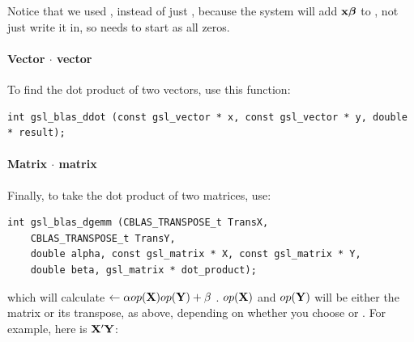 Notice that we used , instead of just , because
the system will add ${\bf x}{\mbox{\boldmath$\beta$}}$ to , not just write it in,
so  needs to start as all zeros.

\paragraph{Vector $\cdot$ vector}
To find the dot product of two vectors, use this function:
\begin{lstlisting}
int gsl_blas_ddot (const gsl_vector * x, const gsl_vector * y, double * result);
\end{lstlisting}




\paragraph{Matrix $\cdot$ matrix}
Finally, to take the dot product of two matrices, use:
\begin{lstlisting}
int gsl_blas_dgemm (CBLAS_TRANSPOSE_t TransX, 
    CBLAS_TRANSPOSE_t TransY, 
    double alpha, const gsl_matrix * X, const gsl_matrix * Y, 
    double beta, gsl_matrix * dot_product);
\end{lstlisting}
which will calculate  $\leftarrow \alpha op({\bf X}) op({\bf Y}) + \beta$ . $op({\bf X})$ and
$op({\bf Y})$ will be either the matrix or its transpose, as above, depending on whether you choose 
or . For example, here is ${\bf X}'{\bf Y}$:

